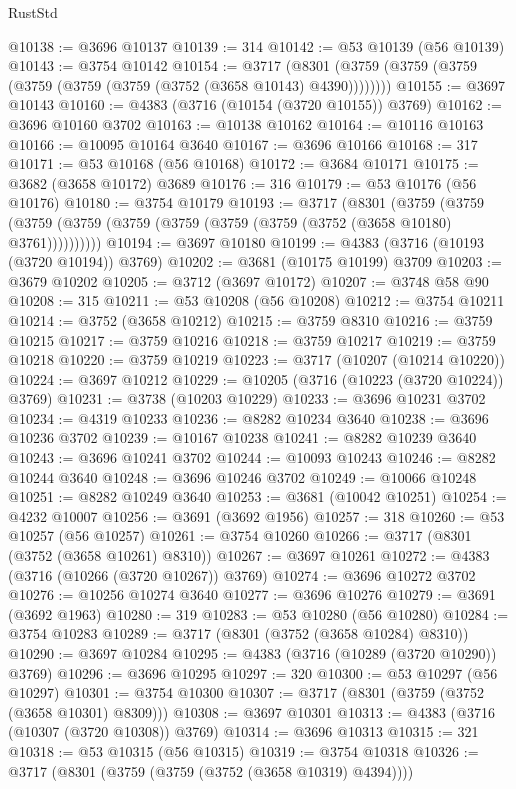 \begin{lexlean}{RustStd}
\begin{coremodule}
@10138 := @3696 @10137
@10139 := 314
@10142 := @53 @10139 (@56 @10139)
@10143 := @3754 @10142
@10154 := @3717 (@8301 (@3759 (@3759 (@3759 (@3759 (@3759 (@3759 (@3752 (@3658 @10143) @4390))))))))
@10155 := @3697 @10143
@10160 := @4383 (@3716 (@10154 (@3720 @10155)) @3769)
@10162 := @3696 @10160 @3702
@10163 := @10138 @10162
@10164 := @10116 @10163
@10166 := @10095 @10164 @3640
@10167 := @3696 @10166
@10168 := 317
@10171 := @53 @10168 (@56 @10168)
@10172 := @3684 @10171
@10175 := @3682 (@3658 @10172) @3689
@10176 := 316
@10179 := @53 @10176 (@56 @10176)
@10180 := @3754 @10179
@10193 := @3717
    (@8301
      (@3759 (@3759 (@3759 (@3759 (@3759 (@3759 (@3759 (@3759 (@3752 (@3658 @10180) @3761))))))))))
@10194 := @3697 @10180
@10199 := @4383 (@3716 (@10193 (@3720 @10194)) @3769)
@10202 := @3681 (@10175 @10199) @3709
@10203 := @3679 @10202
@10205 := @3712 (@3697 @10172)
@10207 := @3748 @58 @90
@10208 := 315
@10211 := @53 @10208 (@56 @10208)
@10212 := @3754 @10211
@10214 := @3752 (@3658 @10212)
@10215 := @3759 @8310
@10216 := @3759 @10215
@10217 := @3759 @10216
@10218 := @3759 @10217
@10219 := @3759 @10218
@10220 := @3759 @10219
@10223 := @3717 (@10207 (@10214 @10220))
@10224 := @3697 @10212
@10229 := @10205 (@3716 (@10223 (@3720 @10224)) @3769)
@10231 := @3738 (@10203 @10229)
@10233 := @3696 @10231 @3702
@10234 := @4319 @10233
@10236 := @8282 @10234 @3640
@10238 := @3696 @10236 @3702
@10239 := @10167 @10238
@10241 := @8282 @10239 @3640
@10243 := @3696 @10241 @3702
@10244 := @10093 @10243
@10246 := @8282 @10244 @3640
@10248 := @3696 @10246 @3702
@10249 := @10066 @10248
@10251 := @8282 @10249 @3640
@10253 := @3681 (@10042 @10251)
@10254 := @4232 @10007
@10256 := @3691 (@3692 @1956)
@10257 := 318
@10260 := @53 @10257 (@56 @10257)
@10261 := @3754 @10260
@10266 := @3717 (@8301 (@3752 (@3658 @10261) @8310))
@10267 := @3697 @10261
@10272 := @4383 (@3716 (@10266 (@3720 @10267)) @3769)
@10274 := @3696 @10272 @3702
@10276 := @10256 @10274 @3640
@10277 := @3696 @10276
@10279 := @3691 (@3692 @1963)
@10280 := 319
@10283 := @53 @10280 (@56 @10280)
@10284 := @3754 @10283
@10289 := @3717 (@8301 (@3752 (@3658 @10284) @8310))
@10290 := @3697 @10284
@10295 := @4383 (@3716 (@10289 (@3720 @10290)) @3769)
@10296 := @3696 @10295
@10297 := 320
@10300 := @53 @10297 (@56 @10297)
@10301 := @3754 @10300
@10307 := @3717 (@8301 (@3759 (@3752 (@3658 @10301) @8309)))
@10308 := @3697 @10301
@10313 := @4383 (@3716 (@10307 (@3720 @10308)) @3769)
@10314 := @3696 @10313
@10315 := 321
@10318 := @53 @10315 (@56 @10315)
@10319 := @3754 @10318
@10326 := @3717 (@8301 (@3759 (@3759 (@3752 (@3658 @10319) @4394))))

\end{coremodule}
\end{lexlean}
